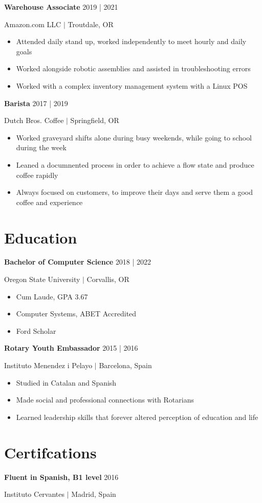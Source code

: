 \documentclass[12pt,letterpaper]{article}
\begin{document}
	\noindent \textbf{Warehouse Associate}
	{\hfill 2019 | 2021}

	\noindent Amazon.com LLC $\vert$ Troutdale, OR
	\begin{itemize}
		\item Attended daily stand up, worked independently to meet hourly and daily goals
		\item Worked alongside robotic assemblies and assisted in troubleshooting errors
		\item Worked with a complex inventory management system with a Linux POS
	\end{itemize}

	\noindent \textbf{Barista}
	{\hfill 2017 | 2019}

	\noindent Dutch Bros. Coffee $\vert$ Springfield, OR
	\begin{itemize}
		\item Worked graveyard shifts alone during busy weekends, while going to school during the week
		\item Leaned a documnented process in order to achieve a flow state and produce coffee rapidly
		\item Always focused on customers, to improve their days and serve them a good coffee and experience
	\end{itemize}


	\section*{Education}

	\noindent \textbf{Bachelor of Computer Science}
	{\hfill 2018 | 2022}

	\noindent Oregon State University $\vert$ Corvallis, OR

    \begin{itemize}
		\item Cum Laude, GPA 3.67
		\item Computer Systems, ABET Accredited
		\item Ford Scholar
	\end{itemize}

	\noindent \textbf{Rotary Youth Embassador}
	{\hfill 2015 | 2016}

	\noindent Instituto Menendez i Pelayo $\vert$ Barcelona, Spain

	\begin{itemize}
		\item Studied in Catalan and Spanish
		\item Made social and professional connections with Rotarians
		\item Learned leadership skills that forever altered perception of education and life
	\end{itemize}

    \section*{Certifcations}

	\textbf{Fluent in Spanish, B1 level} \hfill 2016

	\noindent Instituto Cervantes $\vert$ Madrid, Spain

    
	
\end{document}
